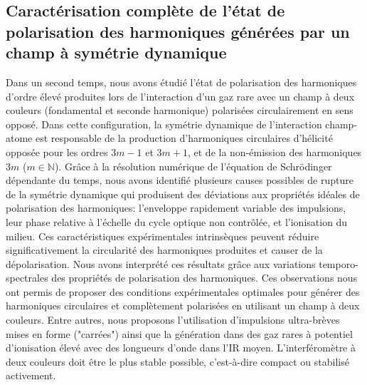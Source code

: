 \subsection*{Caractérisation complète de l'état de polarisation des harmoniques générées par un champ à symétrie dynamique}
Dans un second temps, nous avons étudié l'état de polarisation des harmoniques d'ordre élevé produites lors de l'interaction d'un gaz rare avec un champ à deux couleurs (fondamental et seconde harmonique) polarisées circulairement en sens opposé. Dans cette configuration, la symétrie dynamique de l'interaction champ-atome est responsable de la production d'harmoniques circulaires d'hélicité opposée pour les ordres $3m-1$ et $3m+1$, et de la non-émission des harmoniques $3m$ ($m \in \mathbb{N}$). Grâce à la résolution numérique de l'équation de Schrödinger dépendante du temps, nous avons identifié plusieurs causes possibles de rupture de la symétrie dynamique qui produisent des déviations aux propriétés idéales de polarisation des harmoniques: l'enveloppe rapidement variable des impulsions, leur phase relative à l'échelle du cycle optique non contrôlée, et l'ionisation du milieu. Ces caractéristiques expérimentales intrinsèques peuvent réduire significativement la circularité des harmoniques produites et causer de la dépolarisation. Nous avons interprété ces résultats grâce aux variations temporo-spectrales des propriétés de polarisation des harmoniques. Ces observations nous ont permis de proposer des conditions expérimentales optimales pour générer des harmoniques circulaires et complètement polarisées en utilisant un champ à deux couleurs. Entre autres, nous proposons l'utilisation d'impulsions ultra-brèves mises en forme ("carrées") ainsi que la génération dans des gaz rares à potentiel d'ionisation élevé avec des longueurs d'onde dans l'IR moyen. L'interféromètre à deux couleurs doit être le plus stable possible, c'est-à-dire compact ou stabilisé activement. 

